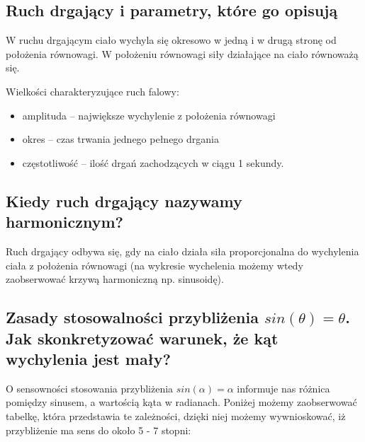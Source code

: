 \documentclass[a4paper,12pt]{article}
\begin{document}
\newpage





\begin{justify}
\label{theory}

\subsection{Ruch drgający i parametry, które go opisują}
W ruchu drgającym ciało wychyla się okresowo w jedną i w drugą stronę od położenia równowagi. W położeniu równowagi siły działające na ciało równoważą się.

Wielkości charakteryzujące ruch falowy:
\begin{itemize}
\item amplituda – największe wychylenie z położenia równowagi
\item okres – czas trwania jednego pełnego drgania
\item częstotliwość – ilość drgań zachodzących w ciągu 1 sekundy.
\end{itemize}

\subsection{Kiedy ruch drgający nazywamy harmonicznym?}
Ruch drgający odbywa się, gdy na ciało działa siła proporcjonalna do wychylenia ciała z położenia równowagi (na wykresie wychelenia możemy wtedy zaobserwować krzywą harmoniczną np. sinusoidę).

\subsection{Zasady stosowalności przybliżenia $sin(\theta) = \theta$. Jak skonkretyzować warunek, że kąt wychylenia jest mały? }
O sensowności stosowania przybliżenia $sin(\alpha) = \alpha$ informuje nas różnica pomiędzy sinusem, a wartością kąta w radianach. Poniżej możemy zaobserwować tabelkę, która przedstawia te zależności, dzięki niej możemy wywnioskować, iż przybliżenie ma sens do około 5 - 7 stopni:


\end{justify}
\end{document}
